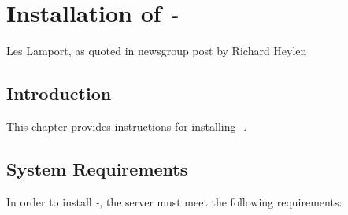 
\chapter{Installation of \emph{\productbasename{}-\productversion{}}}

\label{cist0}

                  {Les Lamport, as quoted in newsgroup post by Richard Heylen}


\section{Introduction}
\label{cist0:sint0}

This chapter provides instructions for installing
\emph{\productbasename{}-\productversion{}}.


\section{System Requirements}
\label{cist0:ssrq0}

In order to install 
\emph{\productbasename{}-\productversion{}}, the
server must meet the following requirements:

